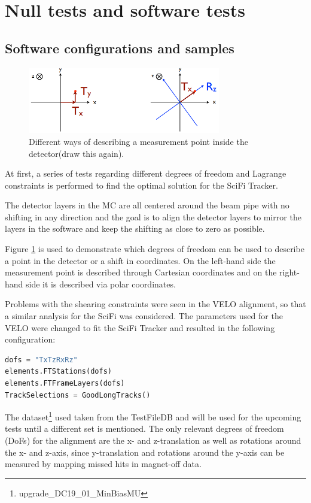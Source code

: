 \section{Null tests and software tests}
\subsection{Software configurations and samples}
\begin{figure}
  \centering
  \includegraphics[width=0.75\textwidth]{plots/point_dofs.png}
  \caption{Different ways of describing a measurement point inside the detector(draw this again).}
  \label{fig:dofs}
\end{figure}

At first, a series of tests regarding different degrees of freedom and Lagrange constraints is performed to find the optimal solution for the SciFi Tracker.

The detector layers in the MC are all centered around the beam pipe with no shifting in any direction and the goal is to align the detector layers to mirror the layers in the software and keep the shifting as close to zero as possible.

Figure \ref{fig:dofs} is used to demonstrate which degrees of freedom can be used
to describe a point in the detector or a shift in coordinates.
On the left-hand side the measurement point is described through Cartesian coordinates and on the right-hand side it is described via polar coordinates.

Problems with the shearing constraints were seen in the VELO alignment, so that a similar analysis for the SciFi was considered.
The parameters used for the VELO were changed to fit the SciFi Tracker and resulted in the following configuration:

\begin{lstlisting}[language=Python, basicstyle=\footnotesize]
dofs = "TxTzRxRz"
elements.FTStations(dofs)
elements.FTFrameLayers(dofs)
TrackSelections = GoodLongTracks()
\end{lstlisting}

The dataset\footnote{upgrade\_DC19\_01\_MinBiasMU} used taken from the TestFileDB\cite{testDB} and will be used for the upcoming tests until a different set is mentioned.
The only relevant degrees of freedom (DoFs) for the alignment are the x- and z-translation as well as rotations around the x- and z-axis, since y-translation and rotations around the y-axis can be measured by mapping missed hits in magnet-off data.

